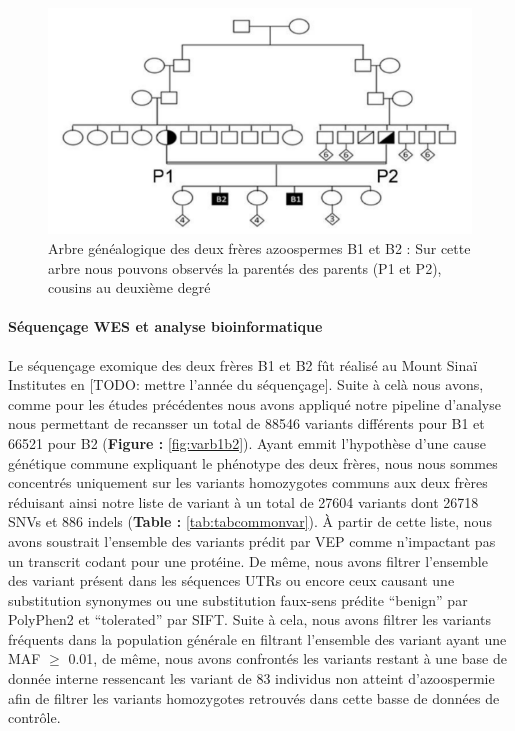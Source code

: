 \documentclass[12pt,twoside]{reedthesis}
\theoremstyle{definition}
\theoremstyle{definition}
\theoremstyle{remark}
\begin{document}
  \begin{figure}
  
  {\centering \includegraphics[scale=0.75]{figure/spink2_arbre_genealogique} 
  
  }
  
  \caption[Arbre généalogique des deux frères azoospermes B1 et B2]{Arbre généalogique des deux frères azoospermes B1 et B2 : Sur cette arbre nous pouvons observés la parentés des parents (P1 et P2), cousins au deuxième degré}\label{fig:spink2tree}
  \end{figure}
  
  \paragraph{Séquençage WES et analyse
  bioinformatique}\label{sequencage-wes-et-analyse-bioinformatique}
  
  Le séquençage exomique des deux frères B1 et B2 fût réalisé au Mount
  Sinaï Institutes en {[}TODO: mettre l'année du séquençage{]}. Suite à
  celà nous avons, comme pour les études précédentes nous avons appliqué
  notre pipeline d'analyse nous permettant de recansser un total de 88546
  variants différents pour B1 et 66521 pour B2 (\textbf{Figure :
  }\ref{fig:varb1b2}). Ayant emmit l'hypothèse d'une cause génétique
  commune expliquant le phénotype des deux frères, nous nous sommes
  concentrés uniquement sur les variants homozygotes communs aux deux
  frères réduisant ainsi notre liste de variant à un total de 27604
  variants dont 26718 SNVs et 886 indels (\textbf{Table :
  }\ref{tab:tabcommonvar}). À partir de cette liste, nous avons soustrait
  l'ensemble des variants prédit par VEP comme n'impactant pas un
  transcrit codant pour une protéine. De même, nous avons filtrer
  l'ensemble des variant présent dans les séquences UTRs ou encore ceux
  causant une substitution synonymes ou une substitution faux-sens prédite
  ``benign'' par PolyPhen2 et ``tolerated'' par SIFT. Suite à cela, nous
  avons filtrer les variants fréquents dans la population générale en
  filtrant l'ensemble des variant ayant une MAF \(\ge\) 0.01, de même,
  nous avons confrontés les variants restant à une base de donnée interne
  ressencant les variant de 83 individus non atteint d'azoospermie afin de
  filtrer les variants homozygotes retrouvés dans cette basse de données
  de contrôle.
  
\end{document}
